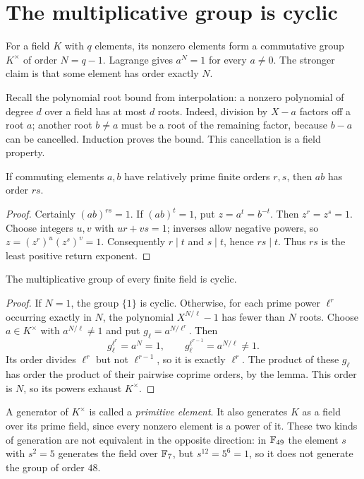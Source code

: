 \section{The multiplicative group is cyclic}
\label{sec:finite-field-cyclic}

For a field $K$ with $q$ elements, its nonzero elements form a
commutative group $K^\times$ of order $N=q-1$. Lagrange gives
$a^N=1$ for every $a\ne0$. The stronger claim is that some element
has order exactly $N$.

Recall the polynomial root bound from interpolation: a nonzero polynomial
of degree $d$ over a field has at most $d$ roots. Indeed, division by
$X-a$ factors off a root $a$; another root $b\ne a$ must be a root of
the remaining factor, because $b-a$ can be cancelled. Induction proves
the bound. This cancellation is a field property.

\begin{lemma}
If commuting elements $a,b$ have relatively prime finite orders $r,s$,
then $ab$ has order $rs$.
\end{lemma}
\begin{proof}
Certainly $(ab)^{rs}=1$. If $(ab)^t=1$, put $z=a^t=b^{-t}$.
Then $z^r=z^s=1$. Choose integers $u,v$ with $ur+vs=1$; inverses
allow negative powers, so $z=(z^r)^u(z^s)^v=1$.
Consequently $r\mid t$ and $s\mid t$, hence $rs\mid t$.
Thus $rs$ is the least positive return exponent.
\end{proof}

\begin{theorem}
\label{thm:finite-field-cyclic}
The multiplicative group of every finite field is cyclic.
\end{theorem}
\begin{proof}
If $N=1$, the group $\{1\}$ is cyclic. Otherwise, for each prime power
$\ell^r$ occurring exactly in $N$, the polynomial $X^{N/\ell}-1$
has fewer than $N$ roots. Choose $a\in K^\times$ with
$a^{N/\ell}\ne1$ and put $g_\ell=a^{N/\ell^r}$. Then
\[
g_\ell^{\ell^r}=a^N=1,\qquad
g_\ell^{\ell^{r-1}}=a^{N/\ell}\ne1.
\]
Its order divides $\ell^r$ but not $\ell^{r-1}$, so it is exactly
$\ell^r$. The product of these $g_\ell$ has order the product of their
pairwise coprime orders, by the lemma. This order is $N$, so its powers
exhaust $K^\times$.
\end{proof}

A generator of $K^\times$ is called a \emph{primitive element}.
It also generates $K$ as a field over its prime field, since every
nonzero element is a power of it. These two kinds of generation are
not equivalent in the opposite direction: in $\mathbb F_{49}$ the element
$s$ with $s^2=5$ generates the field over $\mathbb F_7$, but
$s^{12}=5^6=1$, so it does not generate the group of order $48$.

